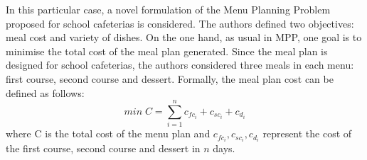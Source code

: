 In this particular case, a novel formulation of the Menu Planning Problem proposed for school cafeterias is considered. The authors defined two objectives: meal cost and variety of dishes.
On the one hand, as usual in MPP, one goal is to minimise the total cost of the meal plan generated. Since the meal plan is designed for school cafeterias, the authors considered three meals in each menu: first course, second course and dessert. Formally, the meal plan cost can be defined as follows:
\[
    min\; C = \sum_{i=1}^{n}{c_{fc_{i}} + c_{sc_{i}} + c_{d_{i}}}
\]
where C is the total cost of the menu plan and $c_{fc_{i}}, c_{sc_{i}}, c_{d_{i}}$ represent the cost of the first course, second course and dessert in $n$ days.

